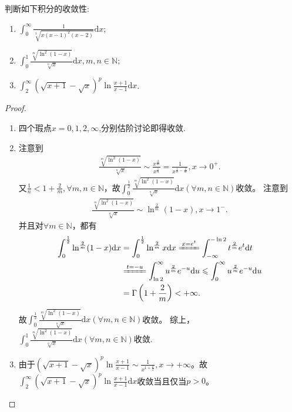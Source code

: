 \documentclass[../../main.tex]{subfiles}
\begin{document}
\begin{example}
判断如下积分的收敛性:
\begin{enumerate}
\item  \(\int_{0}^{\infty}\frac{1}{\sqrt[3]{x(x - 1)^2(x - 2)}}\mathrm{d}x\);

\item \(\int_{0}^{1}\frac{\sqrt[m]{\ln^2(1 - x)}}{\sqrt[n]{x}}\mathrm{d}x, m,n\in\mathbb{N}\);

\item \(\int_{2}^{\infty}(\sqrt{x + 1}-\sqrt{x})^p\ln\frac{x + 1}{x - 1}\mathrm{d}x\).
\end{enumerate}
\end{example}
\begin{proof}
\begin{enumerate}
\item 四个瑕点$x=0,1,2,\infty$,分别估阶讨论即得收敛.

\item 注意到
\begin{align*}
\frac{\sqrt[m]{\ln ^2(1 - x)}}{\sqrt[n]{x}}\sim\frac{x^{\frac{2}{m}}}{x^{\frac{1}{n}}}=\frac{1}{x^{\frac{1}{n}-\frac{2}{m}}},x\rightarrow 0^+.
\end{align*}
又\(\frac{1}{n}<1+\frac{2}{m},\forall m,n\in \mathbb{N}\)，故\(\int_{0}^{\frac{1}{2}}\frac{\sqrt[m]{\ln ^2(1 - x)}}{\sqrt[n]{x}}\mathrm{d}x\left( \forall m,n\in \mathbb{N} \right)\)收敛。
注意到
\begin{align*}
\frac{\sqrt[m]{\ln ^2(1 - x)}}{\sqrt[n]{x}}\sim\ln ^{\frac{2}{m}}(1 - x),x\rightarrow 1^-.
\end{align*}
并且对\(\forall m\in \mathbb{N}\)，都有
\begin{align*}
\int_0^{\frac{1}{2}}{\ln ^{\frac{2}{m}}(1}-x)\mathrm{d}x&=\int_0^{\frac{1}{2}}{\ln ^{\frac{2}{m}}x\mathrm{d}x\xlongequal{x=e^t}\int_{-\infty}^{-\ln 2}{t^{\frac{2}{m}}e^t\mathrm{d}t}}
\\
&\xlongequal{t=-u}\int_{\ln 2}^{\infty}{u^{\frac{2}{m}}e^{-u}\mathrm{d}u}\leqslant \int_0^{\infty}{u^{\frac{2}{m}}e^{-u}\mathrm{d}u}
\\
&=\Gamma \left( 1+\frac{2}{m} \right) <+\infty .
\end{align*}
故\(\int_{0}^{\frac{1}{2}}\frac{\sqrt[m]{\ln ^2(1 - x)}}{\sqrt[n]{x}}\mathrm{d}x\left( \forall m,n\in \mathbb{N} \right)\)收敛。
综上，\(\int_{0}^{1}\frac{\sqrt[m]{\ln ^2(1 - x)}}{\sqrt[n]{x}}\mathrm{d}x\left( \forall m,n\in \mathbb{N} \right)\)收敛.

\item 由于\((\sqrt{x + 1} - \sqrt{x})^p\ln\frac{x + 1}{x - 1}\sim\frac{1}{x^{1+\frac{p}{2}}},x\rightarrow +\infty\)。故\(\int_{2}^{\infty}(\sqrt{x + 1} - \sqrt{x})^p\ln\frac{x + 1}{x - 1} \mathrm{d}x\)收敛当且仅当\(p > 0\)。 
\end{enumerate}

\end{proof}
\end{document}
